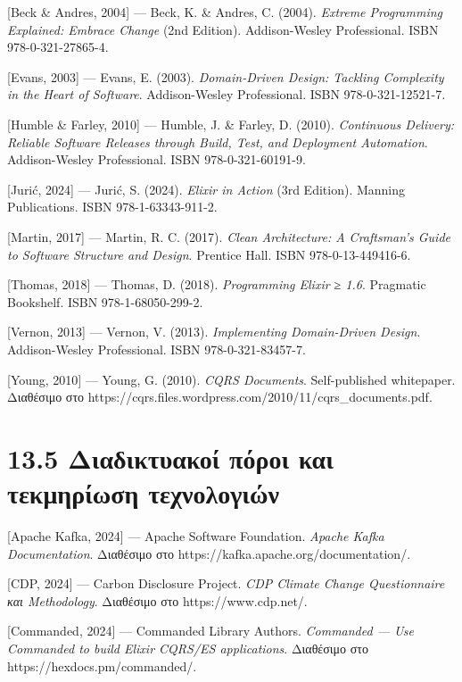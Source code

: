 \documentclass[11pt,a4paper,greek,twoside]{template-xe}
\begin{document}
{[}Beck \& Andres, 2004{]} --- Beck, K. \& Andres, C. (2004).
\emph{Extreme Programming Explained: Embrace Change} (2nd Edition).
Addison-Wesley Professional. ISBN 978-0-321-27865-4.

{[}Evans, 2003{]} --- Evans, E. (2003). \emph{Domain-Driven Design:
Tackling Complexity in the Heart of Software}. Addison-Wesley
Professional. ISBN 978-0-321-12521-7.

{[}Humble \& Farley, 2010{]} --- Humble, J. \& Farley, D. (2010).
\emph{Continuous Delivery: Reliable Software Releases through Build,
Test, and Deployment Automation}. Addison-Wesley Professional. ISBN
978-0-321-60191-9.

{[}Jurić, 2024{]} --- Jurić, S. (2024). \emph{Elixir in Action} (3rd
Edition). Manning Publications. ISBN 978-1-63343-911-2.

{[}Martin, 2017{]} --- Martin, R. C. (2017). \emph{Clean Architecture: A
Craftsman's Guide to Software Structure and Design}. Prentice Hall. ISBN
978-0-13-449416-6.

{[}Thomas, 2018{]} --- Thomas, D. (2018). \emph{Programming Elixir ≥
1.6}. Pragmatic Bookshelf. ISBN 978-1-68050-299-2.

{[}Vernon, 2013{]} --- Vernon, V. (2013). \emph{Implementing
Domain-Driven Design}. Addison-Wesley Professional. ISBN
978-0-321-83457-7.

{[}Young, 2010{]} --- Young, G. (2010). \emph{CQRS Documents}.
Self-published whitepaper. Διαθέσιμο στο
https://cqrs.files.wordpress.com/2010/11/cqrs\_documents.pdf.

\section{13.5 Διαδικτυακοί πόροι και τεκμηρίωση
τεχνολογιών}\label{ux3b4ux3b9ux3b1ux3b4ux3b9ux3baux3c4ux3c5ux3b1ux3baux3bfux3af-ux3c0ux3ccux3c1ux3bfux3b9-ux3baux3b1ux3b9-ux3c4ux3b5ux3baux3bcux3b7ux3c1ux3afux3c9ux3c3ux3b7-ux3c4ux3b5ux3c7ux3bdux3bfux3bbux3bfux3b3ux3b9ux3ceux3bd}

{[}Apache Kafka, 2024{]} --- Apache Software Foundation. \emph{Apache
Kafka Documentation}. Διαθέσιμο στο
https://kafka.apache.org/documentation/.

{[}CDP, 2024{]} --- Carbon Disclosure Project. \emph{CDP Climate Change
Questionnaire και Methodology}. Διαθέσιμο στο https://www.cdp.net/.

{[}Commanded, 2024{]} --- Commanded Library Authors. \emph{Commanded ---
Use Commanded to build Elixir CQRS/ES applications}. Διαθέσιμο στο
https://hexdocs.pm/commanded/.
\end{document}
